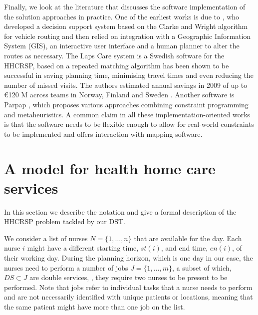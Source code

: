 \documentclass[a4paper,11pt]{elsarticle}
\begin{document}
Finally, we look at the literature that discusses the software implementation of the solution approaches in practice. One of the earliest works is due to \cite{Begur1997}, who developed a decision support system based on the Clarke and Wright algorithm \citep{Clarke1964} for vehicle routing and then relied on integration with a Geographic Information System (GIS), an interactive user interface and a human planner to alter the routes as necessary. The Laps Care system \citep{Eveborn2006, Eveborn2009a} is a Swedish software for the HHCRSP, based on a repeated matching algorithm has been shown to be successful in saving planning time, minimising travel times and even reducing the number of missed visits. The authors estimated annual savings in 2009 of up to €120 M across teams in Norway, Finland and Sweden \citep{Eveborn2009a}. Another software is Parpap \citep{BERTELS20062866}, which proposes various approaches combining constraint programming and metaheuristics. A common claim in all these implementation-oriented works is that the software needs to be flexible enough to allow for real-world constraints to be implemented and offers interaction with mapping software.


\section{A model for health home care services}\label{seq:model description}

In this section we describe the notation and give a formal description of the HHCRSP problem tackled by our DST.

We consider a list of nurses $N = \{1,\dots,n\}$ that are available for the day. Each nurse $i$ might have a different starting time, $st(i)$, and end time, $en(i)$, of their working day. During the planning horizon, which is one day in our case, the nurses need to perform a number of jobs $J = \{1,\dots,m\}$, a subset of which, $DS \subset J$ are double services, \ie, they require two nurses to be present to be performed. Note that jobs refer to individual tasks that a nurse needs to perform and are not necessarily identified with unique patients or locations, meaning that the same patient might have more than one job on the list.
\end{document}
